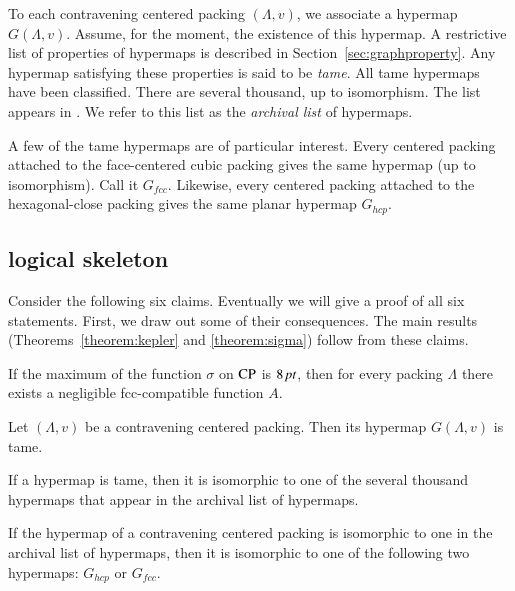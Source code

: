 To each contravening centered packing $(\Lambda,v)$, we associate a hypermap
$G(\Lambda,v)$.   Assume, for the moment, the existence of this hypermap.
A restrictive list of properties of hypermaps is described in
Section~\ref{sec:graphproperty}. Any hypermap satisfying these
properties is said to be {\it tame}. All  tame
hypermaps have been classified. There are several thousand, up to
isomorphism.  The list appears in \cite{web}.  We refer to this
list as the {\it archival list}
of hypermaps.

A few of the tame hypermaps are of particular interest. Every
centered packing attached to the face-centered cubic packing gives
the same hypermap (up to isomorphism).  Call it $G_{fcc}$.
Likewise, every centered packing attached to the hexagonal-close
packing gives the same planar hypermap $G_{hcp}$.


\subsection{logical skeleton}
\label{sec:logic}

Consider the following six claims.  Eventually we will give a
proof of all six statements.  First, we draw out some of their
consequences.  The main results (Theorems~\ref{theorem:kepler} and
\ref{theorem:sigma}) follow from these claims.

\begin{claim}\label{claim-A}
If the maximum of the function $\sigma$ on ${\operatorname{CP}}$ is $8\,\hbox{\it pt}$,
then for every %
packing $\Lambda$ there exists a
negligible fcc-compatible function $A$.
\end{claim}

\begin{claim}\label{claim-B}
Let $(\Lambda,v)$ be a contravening centered packing. Then its hypermap
$G(\Lambda,v)$ is tame.
\end{claim} %

\begin{claim}\label{claim-C}
If a hypermap is tame, then it is isomorphic to one of the several
thousand hypermaps that appear in the archival list of hypermaps.
\end{claim} %

\begin{claim}\label{claim-D}
If the hypermap of a contravening centered packing is isomorphic
to one in the archival list of hypermaps, then it is isomorphic to
one of the following two hypermaps:  $G_{hcp}$ or $G_{fcc}$.
\end{claim} %

